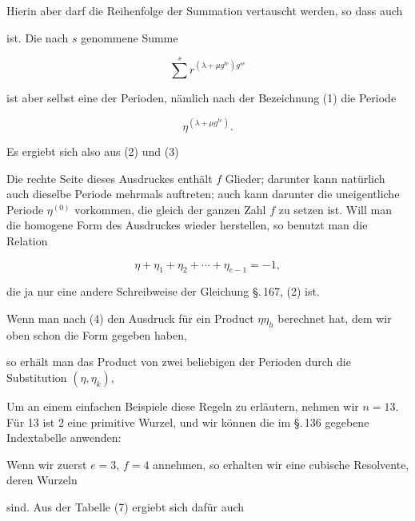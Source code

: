 Hierin aber darf die Reihenfolge der Summation vertauscht
werden, so dass auch


ist. Die nach $s$ genommene Summe

\[
\sum^{s} r^{(\lambda + \mu g^{te})g^{se}}
\]

ist aber selbst eine der Perioden, nämlich nach der Bezeichnung (1) die Periode

\[
\eta^{(\lambda + \mu g^{te})}.
\]

Es ergiebt sich also aus (2) und (3)


Die rechte Seite dieses Ausdruckes enthält $f$ Glieder; darunter kann natürlich auch dieselbe Periode mehrmals auftreten;
auch kann darunter die uneigentliche Periode $\eta^{(0)}$ vorkommen,
die gleich der ganzen Zahl $f$ zu setzen ist. Will man die homogene Form des Ausdruckes wieder herstellen, so benutzt man
die Relation

\[
\eta + \eta_1 + \eta_2 + \cdots + \eta_{e-1} = -1,
\]

die ja nur eine andere Schreibweise der Gleichung \S.\,167, (2) ist.

Wenn man nach (4) den Ausdruck für ein Product $\eta\eta_h$
berechnet hat, dem wir oben schon die Form gegeben haben,


so erhält man das Product von zwei beliebigen der Perioden
durch die Substitution $(\eta, \eta_k)$,


Um an einem einfachen Beispiele diese Regeln zu erläutern,
nehmen wir $n = 13$. Für 13 ist 2 eine primitive Wurzel, und
wir können die im \S.\,136 gegebene Indextabelle anwenden:


Wenn wir zuerst $e = 3$, $f = 4$ annehmen, so erhalten wir
eine cubische Resolvente, deren Wurzeln


sind. Aus der Tabelle (7) ergiebt sich dafür auch
